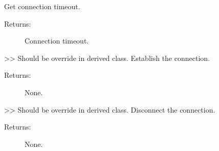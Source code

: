 \documentclass[letterpaper,10pt,english]{sphinxmanual}
\begin{document}
\begin{fulllineitems}
\begin{fulllineitems}
\begin{description}
\end{description}

\end{fulllineitems}


\begin{fulllineitems}
\label{\detokenize{QConnectionLibrary:QConnectionLibrary.tcp.tcp_base.TCPBase.conn_timeout}}
\sphinxAtStartPar
Get connection timeout.
\begin{description}
\item[{Returns:}] \leavevmode
\sphinxAtStartPar
Connection timeout.

\end{description}

\end{fulllineitems}


\begin{fulllineitems}
\label{\detokenize{QConnectionLibrary:QConnectionLibrary.tcp.tcp_base.TCPBase.connect}}
\sphinxAtStartPar
\textgreater{}\textgreater{} Should be override in derived class.
Establish the connection.
\begin{description}
\item[{Returns:}] \leavevmode
\sphinxAtStartPar
None.

\end{description}

\end{fulllineitems}


\begin{fulllineitems}
\label{\detokenize{QConnectionLibrary:QConnectionLibrary.tcp.tcp_base.TCPBase.disconnect}}
\sphinxAtStartPar
\textgreater{}\textgreater{} Should be override in derived class.
Disconnect the connection.
\begin{description}
\item[{Returns:}] \leavevmode
\sphinxAtStartPar
None.


\end{description}
\end{fulllineitems}
\end{fulllineitems}
\end{document}
